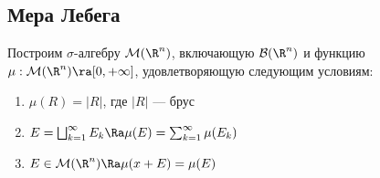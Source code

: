 \subsection{Мера Лебега}
Построим \(\sigma\)-алгебру \(\mathcal{M}(\R^n)\), включающую \(\mathcal{B}(\R^n)\) и функцию \(\mu: \mathcal{M}(\R^n) \ra [0, +\infty]\), удовлетворяющую следующим условиям:
\begin{enumerate}
    \item \(\mu(R) = |R|\), где \(|R|\) --- брус
    \item \(E = \bigsqcup_{k = 1}^\infty E_k \Ra \mu(E) = \sum_{k = 1}^\infty \mu(E_k)\)
    \item \(E \in \mathcal{M}(\R^n) \Ra \mu(x + E) = \mu(E)\)
\end{enumerate}

